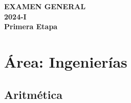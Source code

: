 \newpage
\mbox{}               %
\newpage

\thispagestyle{empty}

\vspace*{\fill}
\begin{center}
	{\Huge\bfseries EXAMEN GENERAL }\\[10pt]
	{\Huge\bfseries 2024-I}\\[10pt]
	{\Large\bfseries Primera Etapa}
\end{center}
\vspace*{\fill}

\clearpage




\section*{Área: Ingenierías}



\subsection*{Aritmética}

